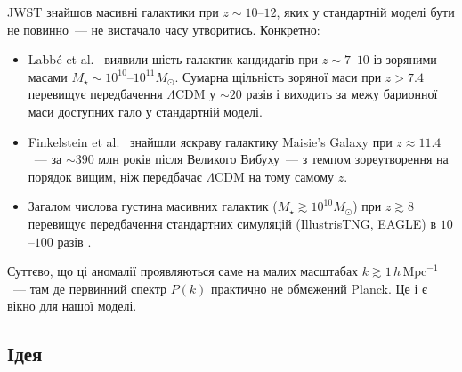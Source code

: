 \documentclass[12pt, a4paper]{article}
\begin{document}
JWST знайшов масивні галактики при $z \sim 10$--$12$, яких у стандартній
моделі бути не повинно~--- не вистачало часу утворитись. Конкретно:

\begin{itemize}
  \item Labb\'e et al.\ \cite{labbe_2023} виявили шість галактик-кандидатів
        при $z \sim 7$--$10$ із зоряними масами $M_\star \sim 10^{10}$--$10^{11}
        M_\odot$. Сумарна щільність зоряної маси при $z > 7.4$
        перевищує передбачення $\Lambda$CDM у $\sim\!20$ разів і
        виходить за межу барионної маси доступних гало у стандартній моделі.
  \item Finkelstein et al.\ \cite{finkelstein_2023} знайшли яскраву галактику
        Maisie's Galaxy при $z \approx 11.4$~--- за ${\sim}390$ млн років
        після Великого Вибуху~--- з темпом зореутворення на порядок вищим,
        ніж передбачає $\Lambda$CDM на тому самому $z$.
  \item Загалом числова густина масивних галактик ($M_\star \gtrsim 10^{10}
        M_\odot$) при $z \gtrsim 8$ перевищує передбачення стандартних
        симуляцій (IllustrisTNG, EAGLE) в $10$--$100$ разів \cite{boylan_kolchin_2023}.
\end{itemize}

Суттєво, що ці аномалії проявляються саме на малих масштабах
$k \gtrsim 1\,h\,\mathrm{Mpc}^{-1}$~--- там де первинний спектр
$P(k)$ практично не обмежений Planck. Це і є вікно для нашої моделі.

\subsection{Ідея}
\end{document}
